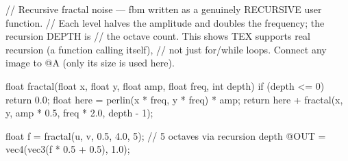 // Recursive fractal noise — fbm written as a genuinely RECURSIVE user function.
// Each level halves the amplitude and doubles the frequency; the recursion DEPTH is
// the octave count. This shows TEX supports real recursion (a function calling itself),
// not just for/while loops. Connect any image to @A (only its size is used here).

float fractal(float x, float y, float amp, float freq, int depth) {
    if (depth <= 0) { return 0.0; }
    float here = perlin(x * freq, y * freq) * amp;
    return here + fractal(x, y, amp * 0.5, freq * 2.0, depth - 1);
}

float f = fractal(u, v, 0.5, 4.0, 5);   // 5 octaves via recursion depth
@OUT = vec4(vec3(f * 0.5 + 0.5), 1.0);
